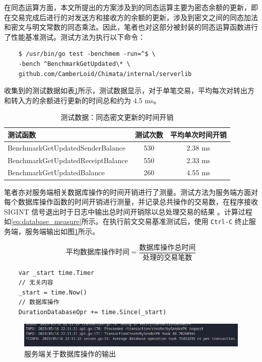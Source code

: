 在同态运算方面，本文所提出的方案涉及到的同态运算主要为密态余额的更新，即在交易完成后进行的对发送方和接收方的余额的更新，涉及到密文之间的同态加法和密文与明文常数的同态乘法。因此，笔者也对这部分被封装的同态运算函数进行了性能基准测试。测试方法为执行以下命令：

\begin{verbatim}
    $ /usr/bin/go test -benchmem -run=^$ \
    -bench ^BenchmarkGetUpdated\* \
    github.com/CamberLoid/Chimata/internal/serverlib
\end{verbatim}

收集到的测试数据如表\ref{Tab:CTUpdate}所示，测试数据显示，对于单笔交易，平均每次对转出方和转入方的余额进行更新的时间总和约为 4.5 ms。

\begin{table}[h]
    \centering
    \begin{tabular}{|l|c|c|}
        \hline
        测试函数 & 测试次数 & 平均单次时间开销 \\
        \hline
        BenchmarkGetUpdatedSenderBalance & 530 & 2.38 ms \\
        \hline
        BenchmarkGetUpdatedReceiptBalance & 550 & 2.33 ms \\
        \hline
        BenchmarkGetUpdatedBalance & 260 & 4.55 ms \\
        \hline
    \end{tabular}
    \caption{测试数据：同态密文更新的时间开销} \label{Tab:CTUpdate}
\end{table}

笔者亦对服务端相关数据库操作的时间开销进行了测量。测试方法为服务端方面对每个数据库操作函数的时间开销进行测量，并记录总共操作的交易数，在程序接收 SIGINT 信号退出时于日志中输出总时间开销除以总处理交易的结果 。计算过程如\eqref{eq:database_measure}所示。在执行前文交易基准测试后，使用 \texttt{Ctrl-C} 终止服务端，服务端输出如图\ref{Fig:bench_database_perf}所示。

\begin{equation} \label{eq:database_measure}
    \textrm{平均数据库操作时间} = \frac{\textrm{数据库操作总时间}}{\textrm{处理的交易笔数}}
\end{equation}

\begin{verbatim}
    var _start time.Timer
    // 无关内容
    _start = time.Now()
    // 数据库操作
    DurationDatabaseOpr += time.Since(_start)
\end{verbatim}

\begin{figure}[h]
    \centering
    \includegraphics[width=0.8\linewidth]{./Figures/Test_Database_Perf.png}
    \caption{服务端关于数据库操作的输出} \label{Fig:bench_database_perf}
\end{figure}

